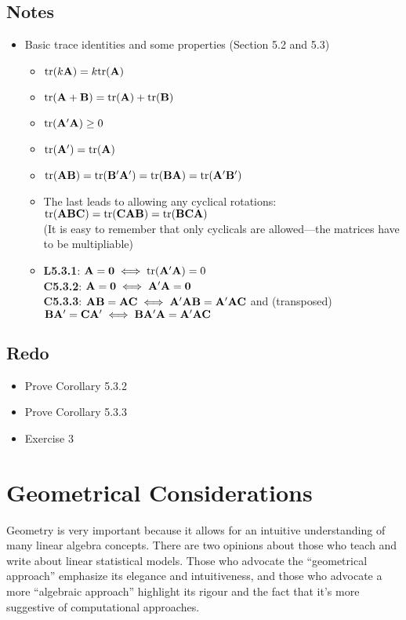 \documentclass[a4paper, oneside]{book}
\begin{document}
\section*{Notes}
\begin{itemize}
\item Basic trace identities and some properties (Section 5.2 and 5.3)
	\begin{itemize}
	\item $\text{tr}(k\mathbf{A}) = k \text{tr}(\mathbf{A})$
	\item $\text{tr}(\mathbf{A+B}) = \text{tr}(\mathbf{A})+\text{tr}(\mathbf{B})$
	\item $\text{tr}(\mathbf{A'A})\geq 0$
	\item $\text{tr}(\mathbf{A}') = \text{tr}(\mathbf{A})$
	\item $\text{tr}(\mathbf{AB}) = \text{tr}(\mathbf{B'A'}) = \text{tr}(\mathbf{BA}) =  \text{tr}(\mathbf{A'B'})$
	\item The last leads to allowing any cyclical rotations: $\text{tr}(\mathbf{ABC}) = \text{tr}(\mathbf{CAB}) = \text{tr}(\mathbf{BCA})$\\
	(It is easy to remember that only cyclicals are allowed\----the matrices have to be multipliable)
	\item \textbf{L5.3.1}: $\mathbf{A} = \mathbf{0} \iff \text{tr}(\mathbf{A'A})=0$ \\
	\textbf{C5.3.2}: $\mathbf{A=0} \iff \mathbf{A'A=0}$ \\
	\textbf{C5.3.3}: $\mathbf{AB=AC} \iff \mathbf{A'AB=A'AC}$ and (transposed) $\mathbf{BA'=CA'} \iff \mathbf{BA'A=A'AC}$ 
	\end{itemize}
\end{itemize}

\section*{Redo}
\begin{itemize}
\item Prove Corollary 5.3.2
\item Prove Corollary 5.3.3
\item Exercise 3
\end{itemize}

\chapter{Geometrical Considerations}
Geometry is very important because it allows for an intuitive understanding of many linear algebra concepts. There are two opinions about those who teach and write about linear statistical models. Those who advocate the ``geometrical approach'' emphasize its elegance and intuitiveness, and those who advocate a more ``algebraic approach'' highlight its rigour and the fact that it's more suggestive of computational approaches.
\end{document}
